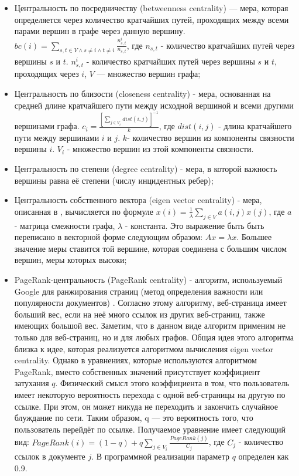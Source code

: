\begin{itemize}
    \item Центральность по посредничеству (betweenness centrality) — мера, которая определяется через количество кратчайших путей, проходящих между всеми парами вершин в графе через данную вершину. $bc(i) = \underset{s,t\in V \wedge s \neq i \wedge t \neq i}\sum_{}{\frac{n^i_{s,t}}{n_{s,t}}}$, где $n_{s,t}$ - количество кратчайших путей через вершины $s$ и $t$. $n^i_{s,t}$ - количество кратчайших путей через вершины $s$ и $t$, проходящих через $i$, $V$ — множество вершин графа;
    \item Центральность по близости (closeness centrality) - мера, основанная на средней длине кратчайшего пути между исходной вершиной и всеми другими вершинами графа.  $c_i=\frac{[\underset{j\in V_i}\sum_{}{dist(i,j)}]^{-1}}{k}$, где $dist(i,j)$ - длина кратчайшего пути между вершинами $i$ и $j$. $k$- количество вершин из компоненты связности вершины $i$. $V_i$ - множество вершин из этой компоненты связности.  \item Центральность по степени (degree centrality) - мера, в которой важность вершины равна её степени (числу инцидентных ребер);
\item Центральность собственного вектора (eigen vector centrality) - мера, описанная в \cite{eigen_vect_cent}, вычисляется по формуле $x(i) = \frac{1}{\lambda}\underset{j \in V}\sum{a(i,j)x(j)}$, где $a$ - матрица смежности графа, $\lambda$ - константа. Это выражение быть быть переписано в векторной форме следующим образом: $Ax = \lambda x$. Большее значение меры ставится той вершине, которая соединена с большим числом вершин, меры которых высоки;
\item  PageRank-центральность (PageRank centrality) - алгоритм, используемый Google для ранжирования страниц (метод определения важности или популярности документов) \cite{pagerank}.  Согласно этому алгоритму, веб-страница имеет больший вес, если на неё много ссылок из других веб-страниц, также имеющих большой вес. Заметим, что в данном виде алгоритм применим не только для веб-страниц, но и для любых графов. Общая идея этого алгоритма близка к идее, которая реализуется алгоритмом вычисления eigen vector centrality. Однако в уравнениях, которые используются алгоритмом PageRank, вместо собственных значений присутствует коэффициент затухания $q$. Физический смысл этого коэффициента в том, что пользователь имеет некоторую вероятность перехода с одной веб-страницы на другую по ссылке. При этом, он может никуда не переходить и закончить случайное блуждание по сети. Таким образом, q — это вероятность того, что пользователь перейдёт по ссылке. Получаемое уравнение имеет следующий вид: $PageRank(i) = (1 - q) + q\underset{j\in V_i}\sum{\frac{PageRank(j)}{C_j}}$, где $C_j$ - количество ссылок в документе $j$. В программной реализации параметр $q$ определен как 0.9.
\end{itemize}

